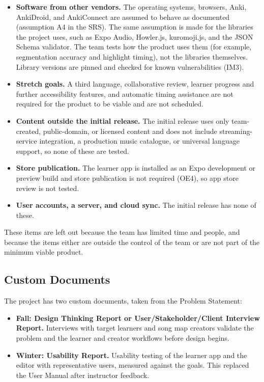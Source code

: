 \documentclass[12pt, titlepage]{article}
\begin{document}
\begin{itemize}
  \item \textbf{Software from other vendors.} The operating systems,
        browsers, Anki, AnkiDroid, and AnkiConnect are assumed to behave as
        documented (assumption A4 in the SRS). The same assumption is made
        for the libraries the project uses, such as Expo Audio, Howler.js,
        kuromoji.js, and the JSON Schema validator. The team tests how the
        product uses them (for example, segmentation accuracy and highlight
        timing), not the libraries themselves. Library versions are pinned and
        checked for known vulnerabilities (IM3).
  \item \textbf{Stretch goals.} A third language,
        collaborative review, learner progress and further accessibility
        features, and automatic timing assistance are not required for the
        product to be viable and are not scheduled.
  \item \textbf{Content outside the initial release.} The initial release uses
        only team-created, public-domain, or licensed content and does not
        include streaming-service integration, a production music catalogue, or
        universal language support, so none of these are tested.
  \item \textbf{Store publication.} The learner app is installed as an Expo
        development or preview build and store publication is not required
        (OE4), so app store review is not tested.
  \item \textbf{User accounts, a server, and cloud sync.} The initial release
        has none of these.
\end{itemize}

These items are left out because the team has limited time and people, and
because the items either are outside the control of the team or are not part
of the minimum viable product.

\subsection{Custom Documents}

The project has two custom documents, taken from the Problem Statement:

\begin{itemize}
  \item \textbf{Fall: Design Thinking Report or User/Stakeholder/Client
        Interview Report.} Interviews with target learners and song map
        creators validate the problem and the learner and creator workflows
        before design begins.
  \item \textbf{Winter: Usability Report.} Usability testing of the learner app
        and the editor with representative users, measured against the goals.
        This replaced the User Manual after instructor feedback.
\end{itemize}
\end{document}
